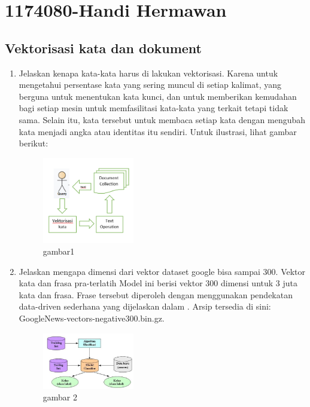 \section{1174080-Handi Hermawan }
\subsection{Vektorisasi kata dan dokument}
\begin{enumerate}

	\item Jelaskan kenapa kata-kata harus di lakukan vektorisasi.
	\hfill\break
	Karena untuk mengetahui persentase kata yang sering muncul di setiap kalimat, yang berguna untuk menentukan kata kunci, dan untuk memberikan kemudahan bagi setiap mesin untuk memfasilitasi kata-kata yang terkait tetapi tidak sama. Selain itu, kata tersebut untuk membaca setiap kata dengan mengubah kata menjadi angka atau identitas itu sendiri. Untuk ilustrasi, lihat gambar berikut: 

	\begin{figure}[H]
	\centering
		\includegraphics[width=4cm]{figures/1174080/5/t1.PNG}
		\caption{gambar1}
	\end{figure}

	\item Jelaskan mengapa dimensi dari vektor dataset google bisa sampai 300.
	\hfill\break
	Vektor kata dan frasa pra-terlatih
	Model ini berisi vektor 300 dimensi untuk 3 juta kata dan frasa. Frase tersebut diperoleh dengan menggunakan pendekatan data-driven sederhana yang dijelaskan dalam . Arsip tersedia di sini: GoogleNews-vectors-negative300.bin.gz. 

	\begin{figure}[H]
	\centering
		\includegraphics[width=4cm]{figures/1174080/5/t2.PNG}
		\caption{gambar 2}
	\end{figure}
	

\end{enumerate}
